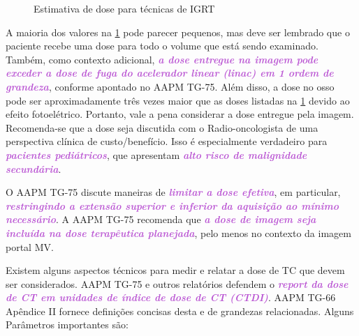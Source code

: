 \documentclass[11pt,a4paper]{article}
\begin{document}
    \begin{figure}[h]
        \centering
        \caption{Estimativa de dose para técnicas de IGRT}
        \label{fig:doseEstimadasParaImagens}
    \end{figure}

    A maioria dos valores na \ref{fig:doseEstimadasParaImagens} pode parecer pequenos, mas deve ser lembrado que o paciente recebe uma dose para todo o volume que está sendo examinado. Também, como contexto adicional, \textcolor{MediumOrchid}{\textbf{\textit{a dose entregue na imagem pode exceder a dose de fuga do acelerador linear (linac) em 1 ordem de grandeza}}}, conforme apontado no AAPM TG-75. Além disso, a dose no osso pode ser aproximadamente três vezes maior que as doses listadas na \ref{fig:doseEstimadasParaImagens} devido ao efeito fotoelétrico. Portanto, vale a pena considerar a dose entregue pela imagem. Recomenda-se que a dose seja discutida com o Radio-oncologista de uma perspectiva clínica de custo/benefício. Isso é especialmente verdadeiro para \textcolor{MediumOrchid}{\textbf{\textit{pacientes pediátricos}}}, que apresentam \textcolor{MediumOrchid}{\textbf{\textit{alto risco de malignidade secundária}}}.
    
    O AAPM TG-75 discute maneiras de \textcolor{MediumOrchid}{\textbf{\textit{limitar a dose efetiva}}}, em particular, \textcolor{MediumOrchid}{\textbf{\textit{restringindo a extensão superior e inferior da aquisição ao mínimo necessário}}}. A AAPM TG-75 recomenda que \textcolor{MediumOrchid}{\textbf{\textit{a dose de imagem seja incluída na dose terapêutica planejada}}}, pelo menos no contexto da imagem portal MV.

    Existem alguns aspectos técnicos para medir e relatar a dose de TC que devem ser considerados. AAPM TG-75 e outros relatórios defendem o \textcolor{MediumOrchid}{\textbf{\textit{report da dose de CT em unidades de índice de dose de CT (CTDI)}}}. AAPM TG-66 Apêndice II fornece definições concisas desta e de grandezas relacionadas. Alguns Parâmetros importantes são:
\end{document}
